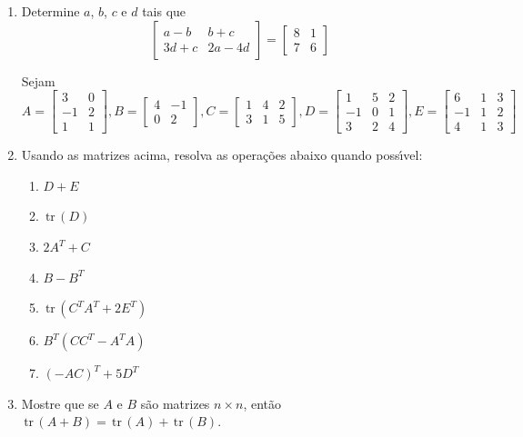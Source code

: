 \documentclass[a4paper,5pt]{amsbook}
\newcommand{\tr}{\,\mbox{tr}\,}
\begin{document}
\begin{enumerate}
	\item Determine $a$, $b$, $c$ e $d$ tais que
		\[\begin{bmatrix}
			a-b & b+c \\
			3d+c & 2a-4d
		\end{bmatrix}
		=
		\begin{bmatrix}
			8 & 1 \\
			7 & 6
		\end{bmatrix}\]

	\vspace{0.5cm}
	\noindent{}Sejam
	\[A = \begin{bmatrix}
			3 & 0 \\
			-1 & 2 \\
			1 & 1
		\end{bmatrix},
	B = \begin{bmatrix}
			4 & -1 \\
			0 & 2
		\end{bmatrix},
	C = \begin{bmatrix}
			1 & 4 & 2 \\
			3 & 1 & 5
		\end{bmatrix},
	D = \begin{bmatrix}
			1 & 5 & 2 \\
			-1 & 0 & 1 \\
			3 & 2 & 4
		\end{bmatrix},
	E = \begin{bmatrix}
			6 & 1 & 3 \\
			-1 & 1 & 2 \\
			4 & 1 & 3
		\end{bmatrix}\]
	\item Usando as matrizes acima, resolva as opera\c{c}\~oes abaixo quando poss\'{\i}vel:
		\begin{enumerate}
			\item $D+E$
			\item $\tr(D)$
			\item $2A^T+C$
			\item $B-B^T$
			\item $\tr(C^TA^T+2E^T)$
			\item $B^T(CC^T-A^TA)$
			\item $(-AC)^T+5D^T$
		\end{enumerate}

	\vspace{0.5cm}
	\item Mostre que se $A$ e $B$ s\~ao matrizes $n\times{}n$, ent\~ao $\tr(A+B) = \tr(A) + \tr(B)$.
\end{enumerate}
\end{document}
